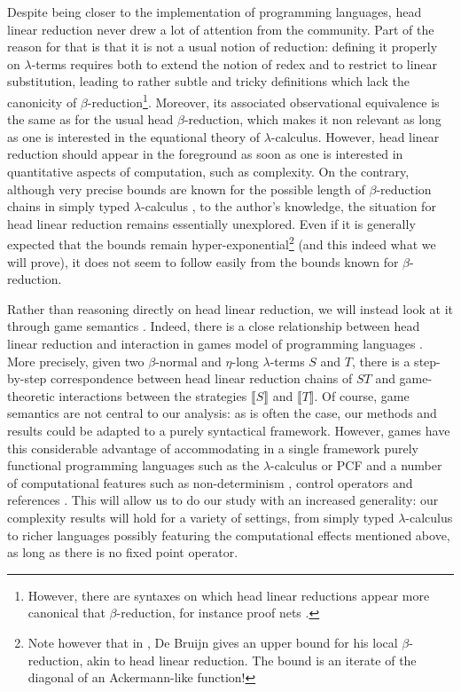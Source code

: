 \documentclass{article}
\newcommand{\intr}[1]{\llbracket #1 \rrbracket}
\begin{document}
Despite being closer to the implementation of programming languages, head linear reduction never drew a lot of attention from the community. Part of the reason for that is that it is not a usual notion of reduction:
defining it properly on $\lambda$-terms requires both to extend the notion of redex and to restrict to linear substitution, leading to rather subtle and tricky definitions which lack the canonicity of 
$\beta$-reduction\footnote{However, there are syntaxes on which head linear reductions appear more canonical that $\beta$-reduction, for instance proof nets \cite{DBLP:journals/tcs/MascariP94}.}. 
Moreover, its associated observational equivalence is the same as for the usual head $\beta$-reduction, which makes it non relevant as long as one is
interested in the equational theory of $\lambda$-calculus.
However, head linear reduction should appear in the foreground as soon as one is interested in quantitative aspects of computation, such as complexity. On the contrary, although very precise bounds are known for the possible length of $\beta$-reduction chains in simply typed $\lambda$-calculus \cite{schwichtenberg1982complexity,beckmann2001exact}, to the author's knowledge, the situation for head linear reduction remains essentially
unexplored. Even if it is generally expected that the bounds remain hyper-exponential\footnote{Note however that in \cite{de1987generalizing}, De Bruijn gives an upper bound for his local $\beta$-reduction, akin to head linear
reduction. The bound is an iterate of the diagonal of an Ackermann-like function!}  (and this indeed what we will prove), it does not seem to follow easily from the bounds known for $\beta$-reduction.


Rather than reasoning directly on head linear reduction, we will instead look at it through game semantics \cite{hyland-ong}. Indeed, there is a close relationship between head linear reduction and interaction in games
model of programming languages \cite{danosregnier}. More precisely, given two $\beta$-normal and $\eta$-long $\lambda$-terms $S$ and $T$, there is a step-by-step correspondence between head linear reduction chains of $S T$ and 
game-theoretic interactions between the strategies $\intr{S}$ and $\intr{T}$. Of course, game semantics are not central to our analysis: as is often the case, our methods and results could be adapted to a purely syntactical
framework. However, games have this considerable advantage of accommodating in a single framework purely functional programming languages such as the $\lambda$-calculus or PCF and a number of computational features such as 
non-determinism \cite{DBLP:conf/lics/HarmerM99}, control operators \cite{DBLP:conf/lics/Laird97} and references \cite{abramsky-mccusker:active-algol}. This will allow us to do our study with an increased generality:
our complexity results will hold for a variety of settings, from simply typed $\lambda$-calculus to richer languages possibly featuring the computational effects mentioned above, as long as there is no
fixed point operator.
\end{document}
